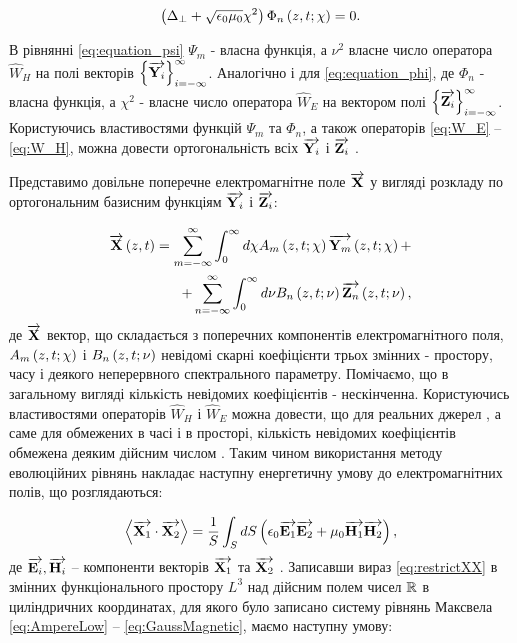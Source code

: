 \begin{equation} \label{eq:equation_phi}
\left( \Delta_\perp + \sqrt{\epsilon_0 \mu_0} \chi^2 \right)
\Phi_n \left( z,t;\chi \right) = 0.
\end{equation}

В рівнянні \eqref{eq:equation_psi} $ \Psi_m $ - власна функція, а $ \nu^2 $ 
власне число оператора $ \widehat{W}_H $ на полі векторів 
$ \left\{ \overrightarrow{\mathbf Y_i} \right\}_{i=-\infty}^\infty $. Аналогічно і для 
\eqref{eq:equation_phi}, де $ \Phi_n $ - власна функція, а $ \chi^2 $ - 
власне число оператора $ \widehat{W}_E $ на вектором полі
$ \left\{ \overrightarrow{\mathbf Z_i} \right\}_{i=-\infty}^\infty $. Користуючись 
властивостями функцій $ \Psi_m $ та $ \Phi_n $, а також операторів 
\eqref{eq:W_E} -- \eqref{eq:W_H}, можна довести ортогональність всіх 
$ \overrightarrow{\mathbf Y_i} $ і $ \overrightarrow{\mathbf Z_i} $ \cite{imp:Tretyakov1994}.

Представимо довільне поперечне електромагнітне поле $ \overrightarrow{\mathbf X} $ у вигляді 
розкладу по ортогональним базисним функціям $ \overrightarrow{\mathbf Y_i} $ і $ \overrightarrow{\mathbf Z_i} $:

\begin{equation} \begin{aligned} \label{eq:modalYZ}
\overrightarrow{\mathbf X} \left( z,t \right) = 
\sum_{m=-\infty}^\infty \int_0^\infty d \chi 
A_m \left( z,t;\chi \right) \overrightarrow{\mathbf Y_m} \left( z,t;\chi \right) + \\
+ \sum_{n=-\infty}^\infty \int_0^\infty d \nu 
B_n \left( z,t;\nu \right) \overrightarrow{\mathbf Z_n} \left( z,t;\nu \right),
\end{aligned} \end{equation}
%
де $ \overrightarrow{\mathbf X} $ вектор, що складається з поперечних компонентів 
електромагнітного поля, $ A_m \left( z,t;\chi \right) $ і $ B_n \left( z,t;\nu \right) $ 
невідомі скарні коефіцієнти трьох змінних - простору, часу і деякого 
неперервного спектрального параметру. Помічаємо, що в загальному вигляді 
кількість невідомих коефіцієнтів - нескінченна. Користуючись властивостями 
операторів $ \widehat{W}_H $ і $ \widehat{W}_E $ можна довести, що для 
реальних джерел \cite{imp:Legenkiy2010}, а саме для обмежених в часі і в 
просторі, кількість невідомих коефіцієнтів обмежена деяким дійсним числом
\cite{imp:Tretyakov2004, imp:Tretyakov2010}. Таким чином використання 
методу еволюційних рівнянь накладає наступну енергетичну 
умову до електромагнітних полів, що розглядаються:

\begin{equation} \label{eq:restrictXX}
\left< \overrightarrow{\mathbf X_1} \cdot \overrightarrow{\mathbf X_2} \right> = \frac{1}{S} \int_{S} dS
\left( \epsilon_0 \overrightarrow{\mathbf E_1} \overrightarrow{\mathbf E_2} + \mu_0 \overrightarrow{\mathbf H_1} \overrightarrow{\mathbf H_2} \right),
\end{equation}
%
де $ \overrightarrow{\mathbf E_i}, \overrightarrow{\mathbf H_i} $ -- компоненти векторів $ \overrightarrow{\mathbf X_1} $ та 
$ \overrightarrow{\mathbf X_2} $ . Записавши вираз \eqref{eq:restrictXX} в змінних 
функціонального простору $ L^3 $ над дійсним полем чисел $ \mathbb{R} $ в 
циліндричних координатах, для якого було записано систему рівнянь Максвела 
\eqref{eq:AmpereLow} -- \eqref{eq:GaussMagnetic}, маємо наступну умову:

